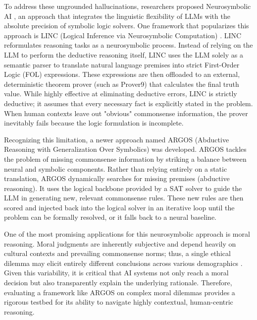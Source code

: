 To address these ungrounded hallucinations, researchers proposed Neurosymbolic AI \citep{Wan2024TowardsCA}, an approach that integrates the linguistic flexibility of LLMs with the absolute precision of symbolic logic solvers. One framework that popularizes this approach is LINC (Logical Inference via Neurosymbolic Computation) \citep{olausson-etal-2023-linc}. LINC reformulates reasoning tasks as a neurosymbolic process. Instead of relying on the LLM to perform the deductive reasoning itself, LINC uses the LLM solely as a semantic parser to translate natural language premises into strict First-Order Logic (FOL) expressions. These expressions are then offloaded to an external, deterministic theorem prover (such as Prover9) that calculates the final truth value. While highly effective at eliminating deductive errors, LINC is strictly deductive; it assumes that every necessary fact is explicitly stated in the problem. When human contexts leave out "obvious" commonsense information, the prover inevitably fails because the logic formulation is incomplete.

Recognizing this limitation, a newer approach named ARGOS (Abductive Reasoning with Generalization Over Symbolics) \citep{cotnareanu2026balanced} was developed. ARGOS tackles the problem of missing commonsense information by striking a balance between neural and symbolic components. Rather than relying entirely on a static translation, ARGOS dynamically searches for missing premises (abductive reasoning). It uses the logical backbone provided by a SAT solver \citep{VanHarmelen2008-VANHOK} to guide the LLM in generating new, relevant commonsense rules. These new rules are then scored and injected back into the logical solver in an iterative loop until the problem can be formally resolved, or it falls back to a neural baseline.

One of the most promising applications for this neurosymbolic approach is moral reasoning. Moral judgments are inherently subjective and depend heavily on cultural contexts and prevailing commonsense norms; thus, a single ethical dilemma may elicit entirely different conclusions across various demographics \citep{Bentahila2021}. Given this variability, it is critical that AI systems not only reach a moral decision but also transparently explain the underlying rationale. Therefore, evaluating a framework like ARGOS on complex moral dilemmas provides a rigorous testbed for its ability to navigate highly contextual, human-centric reasoning.

